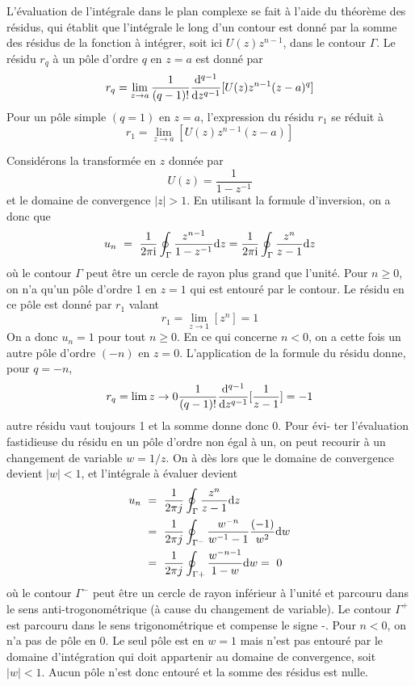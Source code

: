 L'\'{e}valuation de l'int\'{e}grale dans le plan complexe se fait \`{a} l'aide du th\'{e}or\`{e}me des r\'{e}sidus, qui \'{e}tablit que l'int\'{e}grale le long d'un contour est donn\'{e} par la somme des r\'{e}sidus de la fonction \`{a} int\'{e}grer, soit ici $U(z)z^{n-1}$, dans le contour $\Gamma$. Le r\'{e}sidu $r_{q}$ \`{a} un p\^{o}le d'ordre $q$ en $z=a$ est donn\'{e} par
\begin{equation}
\label{eq:residu-q}
r_{q}=\lim_{z\rightarrow a}\frac{1}{(q-1)!}\frac{\mathrm{d} ^{q-1}}{\mathrm{d} z^{q-1}}[U(z)z^{n-1}(z-a)^{q}]
\end{equation}
Pour un p\^{o}le simple $(q=1)$ en $z=a$, l'expression du r\'{e}sidu $r_{1}$ se r\'{e}duit \`{a}
\begin{equation}
\label{eq:residu-simple}
r_{1}=\lim_{z\rightarrow a}[U(z)z^{n-1}(z-a)]
\end{equation}
\begin{example}
Consid\'{e}rons la transform\'{e}e en $z$ donn\'{e}e par
$$
U(z)=\frac{1}{1-z^{-1}}
$$
et le domaine de convergence $|z|>1$. En utilisant la formule d'inversion, on a donc que
\begin{align*}
u_n\ =\ \frac{1}{2\pi \mathrm{i}}\oint_{\Gamma}\frac{z^{n-1}}{1-z^{-1}}\mathrm{d} z= \frac{1}{2\pi \mathrm{i}}\oint_{\Gamma}\frac{z^{n}}{z-1}\mathrm{d} z
\end{align*}
o\`{u} le contour $\Gamma$ peut \^{e}tre un cercle de rayon plus grand que l'unit\'{e}. Pour $n\geq 0$, on n'a qu'un p\^{o}le d'ordre 1 en $z=1$ qui est entour\'{e} par le contour. Le r\'{e}sidu en ce p\^{o}le est donn\'{e} par $r_{1}$ valant
$$
r_{1}=\lim_{z\rightarrow 1}[z^{n}]=1
$$
On a donc $u_n=1$ pour tout $n \geq 0$. En ce qui concerne $n<0$, on a cette fois un autre p\^{o}le d'ordre $(-n)$ en $z=0$.
L'application de la formule du r\'{e}sidu donne, pour $q=-n$,
$$
 r_{q}=\lim {z\rightarrow 0} \frac{1}{(q-1)!}\frac{\mathrm{d} ^{q-1}}{\mathrm{d} z^{q-1}}[\frac{1}{z-1}]=-1
$$
autre r\'{e}sidu vaut toujours 1 et la somme donne donc $0$.
Pour \'{e}vi- ter l'\'{e}valuation fastidieuse du r\'{e}sidu en un p\^{o}le d'ordre non \'{e}gal \`{a} un, on peut recourir \`{a} un changement de variable $w=1/z$. On \`{a} d\`{e}s lors que le domaine de convergence devient $|w|<1$, et l'int\'{e}grale \`{a} \'{e}valuer devient
\begin{align*}
u_n\ &=\ \frac{1}{2\pi j}\oint_{\Gamma}\frac{z^{n}}{z-1}\mathrm{d}  z \\
     &=\ \frac{1}{2\pi j}\oint_{\Gamma^{-}}\frac{w^{-n}}{w^{-1}-1}\frac{(-1)}{w^{2}}\mathrm{d} w\\
     &=\ \frac{1}{2\pi j}\oint_{\Gamma+}\frac{w^{-n-1}}{1-w}\mathrm{d}  w =\ 0
\end{align*}
o\`{u} le contour $\Gamma^{-}$ peut \^{e}tre un cercle de rayon inf\'{e}rieur \`{a} l'unit\'{e} et parcouru dans le sens anti-trogonométrique (à cause du changement de variable). Le contour $\Gamma^{+}$ est parcouru dans le sens trigonométrique et compense le signe -. Pour $n<0$, on n'a pas de p\^{o}le en $0$. Le seul p\^{o}le est en $w=1$ mais n'est pas entour\'{e} par le domaine d'int\'{e}gration qui doit appartenir au domaine de convergence, soit $|w|<1$. Aucun p\^{o}le n'est donc entour\'{e} et la somme des r\'{e}sidus est nulle.
\end{example}
